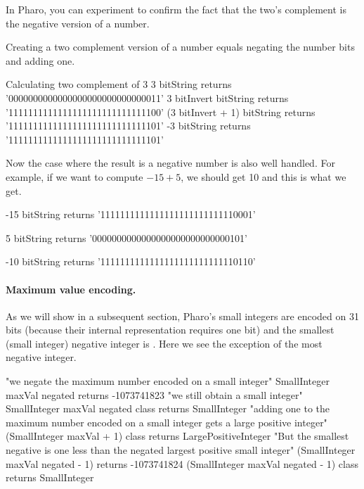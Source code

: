 \documentclass[a4paper,10pt,twoside]{book}
\begin{document}
In Pharo, you can experiment to confirm the fact that the two's complement is the negative version of a number.
 
	
	
Creating a two complement version of a number equals negating the number bits and adding one.
\begin{code}{Calculating two complement of 3}
3 bitString 
	returns '0000000000000000000000000000011'
3 bitInvert bitString 
	returns '1111111111111111111111111111100'
(3 bitInvert + 1) bitString 
	returns '1111111111111111111111111111101'
-3 bitString 
	returns '1111111111111111111111111111101'
\end{code}


Now the case where the result is a negative number is also well handled. For example, if we want to compute $-15 + 5$, we should get 10 and this is what we get.

\begin{code}{}
-15 bitString 
	returns '1111111111111111111111111110001'

5 bitString 
	returns '0000000000000000000000000000101'
	
-10 bitString 
	returns '1111111111111111111111111110110'
\end{code}


\paragraph{Maximum value encoding.}		
As we will show in a subsequent section, Pharo's small integers are encoded on 31 bits (because their internal representation requires one bit) and the smallest (small integer) negative integer is . Here we see the exception of the most negative integer.


\begin{code}{} 
"we negate the maximum number encoded on a small integer"
SmallInteger maxVal negated	 
	  	returns -1073741823
"we still obtain a small integer"		
SmallInteger maxVal negated class
		returns SmallInteger
"adding one to the maximum number encoded on a small integer gets a large positive integer"
(SmallInteger maxVal + 1) class
		returns LargePositiveInteger		
"But the smallest negative is one less than the negated largest positive small integer"		
(SmallInteger maxVal negated - 1) 
		returns -1073741824 
(SmallInteger maxVal negated - 1) class 
		returns SmallInteger 		 
\end{code}
\end{document}
